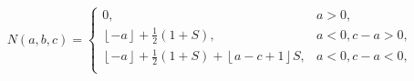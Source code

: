 \[N(a,b,c)=\begin{cases}0,&a>0,\\
\left\lfloor-a\right\rfloor+\tfrac{1}{2}(1+S),&a<0,c-a>0,\\
\left\lfloor-a\right\rfloor+\tfrac{1}{2}(1+S)+\left\lfloor a-c+1\right\rfloor S%
,&a<0,c-a<0,\\
\end{cases}\]